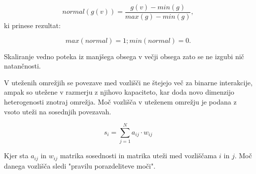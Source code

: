 \documentclass[12pt,a4paper]{amsart}
\begin{document}
$$normal(g(v)) = \frac{g(v) - min(g)}{max(g) - min(g)},$$
ki prinese rezultat: 

$$max(normal) = 1; min(normal) = 0.$$

Skaliranje vedno poteka iz manjšega obsega v večji obsega zato se ne izgubi nič natančnosti.

V uteženih omrežjih se povezave med vozlišči ne štejejo več za binarne interakcije, ampak so utežene v razmerju z njihovo kapaciteto, kar doda novo dimenzijo heterogenosti znotraj  omrežja. Moč vozlišča v uteženem omrežju je podana z vsoto uteži na sosednjih povezavah. 

$$s_i = \sum_{j=1}^{N} a_{ij} \cdot w_{ij}$$

Kjer sta $a_{ij}$  in $w_{ij}$ matrika sosednosti in matrika uteži med vozliščama $i$ in $j$. Moč danega vozlišča sledi "pravilu porazdeliteve moči".
\end{document}
